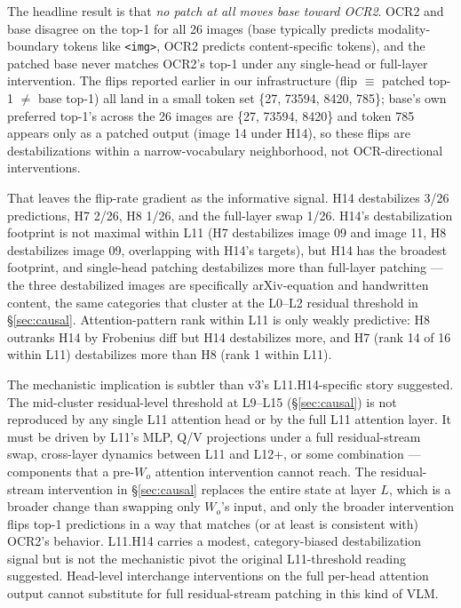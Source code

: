 \documentclass[10pt,twocolumn,letterpaper]{article}
\begin{document}
The headline result is that \emph{no patch at all moves base toward OCR2}. OCR2 and base disagree on the top-1 for all 26 images (base typically predicts modality-boundary tokens like \texttt{<img>}, OCR2 predicts content-specific tokens), and the patched base never matches OCR2's top-1 under any single-head or full-layer intervention. The flips reported earlier in our infrastructure (flip $\equiv$ patched top-1 $\neq$ base top-1) all land in a small token set \{27, 73594, 8420, 785\}; base's own preferred top-1's across the 26 images are \{27, 73594, 8420\} and token 785 appears only as a patched output (image 14 under H14), so these flips are destabilizations within a narrow-vocabulary neighborhood, not OCR-directional interventions.

That leaves the flip-rate gradient as the informative signal. H14 destabilizes 3/26 predictions, H7 2/26, H8 1/26, and the full-layer swap 1/26. H14's destabilization footprint is not maximal within L11 (H7 destabilizes image 09 and image 11, H8 destabilizes image 09, overlapping with H14's targets), but H14 has the broadest footprint, and single-head patching destabilizes more than full-layer patching --- the three destabilized images are specifically arXiv-equation and handwritten content, the same categories that cluster at the L0--L2 residual threshold in \S\ref{sec:causal}. Attention-pattern rank within L11 is only weakly predictive: H8 outranks H14 by Frobenius diff but H14 destabilizes more, and H7 (rank 14 of 16 within L11) destabilizes more than H8 (rank 1 within L11).

The mechanistic implication is subtler than v3's L11.H14-specific story suggested. The mid-cluster residual-level threshold at L9--L15 (\S\ref{sec:causal}) is not reproduced by any single L11 attention head or by the full L11 attention layer. It must be driven by L11's MLP, Q/V projections under a full residual-stream swap, cross-layer dynamics between L11 and L12+, or some combination --- components that a pre-$W_o$ attention intervention cannot reach. The residual-stream intervention in \S\ref{sec:causal} replaces the entire state at layer $L$, which is a broader change than swapping only $W_o$'s input, and only the broader intervention flips top-1 predictions in a way that matches (or at least is consistent with) OCR2's behavior. L11.H14 carries a modest, category-biased destabilization signal but is not the mechanistic pivot the original L11-threshold reading suggested. Head-level interchange interventions \citep{vig2020causal, geiger2021interchange} on the full per-head attention output cannot substitute for full residual-stream patching in this kind of VLM.
\end{document}
